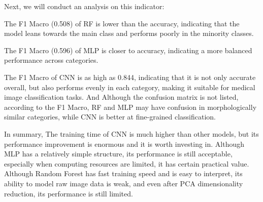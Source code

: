 \noindent

Next, we will conduct an analysis on this indicator:

\noindent

The F1 Macro (0.508) of RF is lower than the accuracy, indicating that the model leans towards the main class and performs poorly in the minority classes.

\noindent

The F1 Macro (0.596) of MLP is closer to accuracy, indicating a more balanced performance across categories.

\noindent

The F1 Macro of CNN is as high as 0.844, indicating that it is not only accurate overall, but also performs evenly in each category, making it suitable for medical image classification tasks. And Although the confusion matrix is not listed, according to the F1 Macro, RF and MLP may have confusion in morphologically similar categories, while CNN is better at fine-grained classification.

\noindent

In summary, The training time of CNN is much higher than other models, but its performance improvement is enormous and it is worth investing in. Although MLP has a relatively simple structure, its performance is still acceptable, especially when computing resources are limited, it has certain practical value. Although Random Forest has fast training speed and is easy to interpret, its ability to model raw image data is weak, and even after PCA dimensionality reduction, its performance is still limited.

